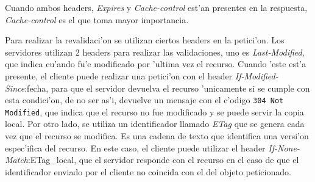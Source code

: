 Cuando ambos headers, \textsl{Expires} y \textsl{Cache-control} est'an presentes en la respuesta, \textsl{Cache-control} es el que toma mayor importancia.

Para realizar la revalidaci'on se utilizan ciertos headers en la petici'on. Los servidores utilizan 2 headers para realizar las validaciones, uno es \textsl{Last-Modified}, que indica cu'ando fu'e modificado por 'ultima vez el recurso. Cuando 'este est'a presente, el cliente puede realizar una petici'on con el header \textsl{If-Modified-Since}:fecha, para que el servidor devuelva el recurso 'unicamente si se cumple con esta condici'on, de no ser as'i, devuelve un mensaje con el c'odigo \texttt{304 Not Modified}, que indica que el recurso no fue modificado y se puede servir la copia local.
Por otro lado, se utiliza un identificador llamado \textsl{ETag} que se genera cada vez que el recurso se modifica. Es una cadena de texto que identifica una versi'on espec'ifica del recurso. En este caso, el cliente puede utilizar el header \textsl{If-None-Match}:ETag\_local, que el servidor responde con el recurso en el caso de que el identificador enviado por el cliente no coincida con el del objeto peticionado.
